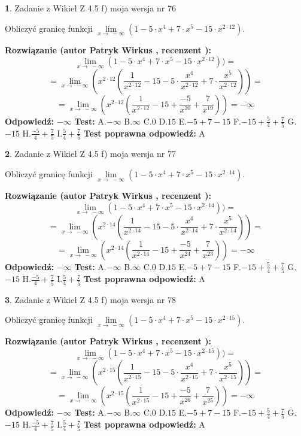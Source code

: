 \documentclass[12pt, a4paper]{article}
\theoremstyle{definition} %
\newtheorem{zad}{}
\newcommand{\zadStart}[1]{\begin{zad}#1\newline}
\newcommand{\zadStop}{\end{zad}}
\newcommand{\rozwStart}[2]{\noindent \textbf{Rozwiązanie (autor #1 , recenzent #2): }\newline}
\newcommand{\rozwStop}{\newline}
\newcommand{\odpStart}{\noindent \textbf{Odpowiedź:}\newline}
\newcommand{\odpStop}{\newline}
\newcommand{\testStart}{\noindent \textbf{Test:}\newline}
\newcommand{\testStop}{\newline}
\newcommand{\kluczStart}{\noindent \textbf{Test poprawna odpowiedź:}\newline}
\newcommand{\kluczStop}{\newline}
\begin{document}
\zadStart{Zadanie z Wikieł Z 4.5 f) moja wersja nr 76}



Obliczyć granicę funkcji  $\lim\limits_{x\to\ -\infty}(1 - 5 \cdot x^{4}+7 \cdot x^{5}- 15 \cdot x^{2\cdot12})$.
\zadStop
\rozwStart{Patryk Wirkus}{}
$$\lim\limits_{x\to\ -\infty}(1 - 5 \cdot x^{4}+7 \cdot x^{5}- 15 \cdot x^{2\cdot12}))=$$
$$=\lim\limits_{x\to\ -\infty}(x^{2\cdot12}(\frac{1}{x^{2\cdot12}}-15 -5 \cdot \frac{x^{4}}{x^{2\cdot12}}+7 \cdot \frac{x^{5}}{x^{2\cdot12}}))=$$
$$=\lim\limits_{x\to\ -\infty}(x^{2\cdot12}(\frac{1}{x^{2\cdot12}}-15 + \frac{-5}{x^{20}}+ \frac{7}{x^{19}}))=-\infty$$
\rozwStop
\odpStart
$-\infty$
\odpStop
\testStart
A.$-\infty$ B.$\infty$ C.$0$ D.$15$ E.$-5 + 7 - 15$
F.$-15+\frac{5}{4}+\frac{7}{5}$ G.$-15$
H.$\frac{-5}{4}+\frac{7}{5}$
I.$\frac{5}{4}+\frac{7}{5}$
\testStop
\kluczStart
A
\kluczStop



\zadStart{Zadanie z Wikieł Z 4.5 f) moja wersja nr 77}



Obliczyć granicę funkcji  $\lim\limits_{x\to\ -\infty}(1 - 5 \cdot x^{4}+7 \cdot x^{5}- 15 \cdot x^{2\cdot14})$.
\zadStop
\rozwStart{Patryk Wirkus}{}
$$\lim\limits_{x\to\ -\infty}(1 - 5 \cdot x^{4}+7 \cdot x^{5}- 15 \cdot x^{2\cdot14}))=$$
$$=\lim\limits_{x\to\ -\infty}(x^{2\cdot14}(\frac{1}{x^{2\cdot14}}-15 -5 \cdot \frac{x^{4}}{x^{2\cdot14}}+7 \cdot \frac{x^{5}}{x^{2\cdot14}}))=$$
$$=\lim\limits_{x\to\ -\infty}(x^{2\cdot14}(\frac{1}{x^{2\cdot14}}-15 + \frac{-5}{x^{24}}+ \frac{7}{x^{23}}))=-\infty$$
\rozwStop
\odpStart
$-\infty$
\odpStop
\testStart
A.$-\infty$ B.$\infty$ C.$0$ D.$15$ E.$-5 + 7 - 15$
F.$-15+\frac{5}{4}+\frac{7}{5}$ G.$-15$
H.$\frac{-5}{4}+\frac{7}{5}$
I.$\frac{5}{4}+\frac{7}{5}$
\testStop
\kluczStart
A
\kluczStop



\zadStart{Zadanie z Wikieł Z 4.5 f) moja wersja nr 78}



Obliczyć granicę funkcji  $\lim\limits_{x\to\ -\infty}(1 - 5 \cdot x^{4}+7 \cdot x^{5}- 15 \cdot x^{2\cdot15})$.
\zadStop
\rozwStart{Patryk Wirkus}{}
$$\lim\limits_{x\to\ -\infty}(1 - 5 \cdot x^{4}+7 \cdot x^{5}- 15 \cdot x^{2\cdot15}))=$$
$$=\lim\limits_{x\to\ -\infty}(x^{2\cdot15}(\frac{1}{x^{2\cdot15}}-15 -5 \cdot \frac{x^{4}}{x^{2\cdot15}}+7 \cdot \frac{x^{5}}{x^{2\cdot15}}))=$$
$$=\lim\limits_{x\to\ -\infty}(x^{2\cdot15}(\frac{1}{x^{2\cdot15}}-15 + \frac{-5}{x^{26}}+ \frac{7}{x^{25}}))=-\infty$$
\rozwStop
\odpStart
$-\infty$
\odpStop
\testStart
A.$-\infty$ B.$\infty$ C.$0$ D.$15$ E.$-5 + 7 - 15$
F.$-15+\frac{5}{4}+\frac{7}{5}$ G.$-15$
H.$\frac{-5}{4}+\frac{7}{5}$
I.$\frac{5}{4}+\frac{7}{5}$
\testStop
\kluczStart
A
\kluczStop
\end{document}
